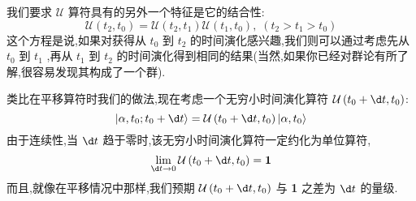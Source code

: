 \documentclass[lang=cn,newtx,10pt,scheme=chinese,thmcnt=section]{elegantbook}
\begin{document}
我们要求 $\mathcal{U}$ 算符具有的另外一个特征是它的结合性:
\begin{equation}\label{2.12}
	\mathcal{U}\left( {{t}_{2},{t}_{0}}\right) = \mathcal{U}\left( {{t}_{2},{t}_{1}}\right) \mathcal{U}\left( {{t}_{1},{t}_{0}}\right) ,\;\left( {{t}_{2} > {t}_{1} > {t}_{0}}\right)
\end{equation}
这个方程是说,如果对获得从 ${t}_{0}$ 到 ${t}_{2}$ 的时间演化感兴趣,我们则可以通过考虑先从 ${t}_{0}$ 到 ${t}_{1}$ ,再从 ${t}_{1}$ 到 ${t}_{2}$ 的时间演化得到相同的结果(当然,如果你已经对群论有所了解,很容易发现其构成了一个群). 

类比在平移算符时我们的做法,现在考虑一个无穷小时间演化算符 $\mathcal{U}\left( {{t}_{0} + {\d t},{t}_{0}}\right)$:
\begin{equation}
	\left| {\alpha ,{t}_{0};{t}_{0} + {\d t}}\right\rangle = \mathcal{U}\left( {{t}_{0} + {\d t},{t}_{0}}\right) \left| {\alpha ,{t}_{0}}\right\rangle
\end{equation}
由于连续性,当 ${\d t}$ 趋于零时,该无穷小时间演化算符一定约化为单位算符,
\begin{equation}
	\mathop{\lim }\limits_{{{\d t} \rightarrow 0}}\mathcal{U}\left( {{t}_{0} + {\d t},{t}_{0}}\right) = \textbf{1}
\end{equation}
而且,就像在平移情况中那样,我们预期 $\mathcal{U}\left( {{t}_{0} + {\d t},{t}_{0}}\right)$ 与 \textbf{1} 之差为 ${\d t}$ 的量级.
\end{document}
